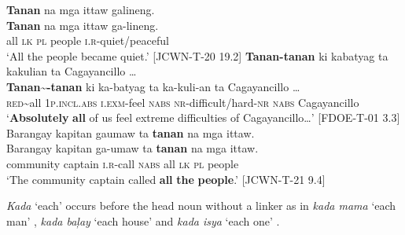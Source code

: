 \ea
\label{bkm:Ref329086952}
\textbf{Tanan}  na  mga  ittaw   galineng. \\\smallskip
 \gll \textbf{Tanan}  na  mga  ittaw   ga-lineng. \\
all   \textsc{lk}  \textsc{pl}  people  \textsc{i.r}-quiet/peaceful \\
\glt ‘All the people became quiet.’ [JCWN-T-20 19.2]
\z
\ea
\label{bkm:Ref424539971}
\textbf{Tanan-tanan}  ki  kabatyag  ta  kakulian ta  Cagayancillo … \\\smallskip
 \gll \textbf{Tanan\sim{}-tanan}  ki  ka-batyag  ta  ka-kuli-an ta  Cagayancillo … \\
\textsc{red}\sim{}all    1\textsc{p.incl.abs}  \textsc{i.exm}-feel  \textsc{nabs}  \textsc{nr}-difficult/hard-\textsc{nr} \textsc{nabs}  Cagayancillo {} \\
\glt ‘\textbf{Absolutely} \textbf{all} of us feel extreme difficulties of Cagayancillo…’ [FDOE-T-01 3.3]
\z
\ea
\label{bkm:Ref425584609}
Barangay  kapitan  gaumaw  ta  \textbf{tanan}  na  mga  ittaw. \\\smallskip
 \gll Barangay  kapitan  ga-umaw  ta  \textbf{tanan}  na  mga  ittaw. \\
community  captain  \textsc{i.r}-call  \textsc{nabs}  all  \textsc{lk}  \textsc{pl}  people \\
\glt ‘The community captain called \textbf{all} \textbf{the} \textbf{people}.’ [JCWN-T-21 9.4]
\z

\textit{Kada} ‘each’ occurs before the head noun without a linker as in \textit{kada mama} ‘each man’ , \textit{kada baļay} ‘each house’  and \textit{kada isya} ‘each one’ .

